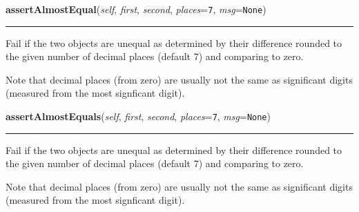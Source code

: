     \label{unittest:TestCase:failUnlessAlmostEqual}

    \vspace{0.5ex}

    \begin{boxedminipage}{\textwidth}

    \raggedright \textbf{assertAlmostEqual}(\textit{self}, \textit{first}, \textit{second}, \textit{places}=\texttt{7}, \textit{msg}=\texttt{None})

    \vspace{-1.5ex}

    \rule{\textwidth}{0.5\fboxrule}
    Fail if the two objects are unequal as determined by their difference 
    rounded to the given number of decimal places (default 7) and comparing
    to zero.

    Note that decimal places (from zero) are usually not the same as 
    significant digits (measured from the most signficant digit).

    \vspace{1ex}

    \end{boxedminipage}

    \label{unittest:TestCase:failUnlessAlmostEqual}

    \vspace{0.5ex}

    \begin{boxedminipage}{\textwidth}

    \raggedright \textbf{assertAlmostEquals}(\textit{self}, \textit{first}, \textit{second}, \textit{places}=\texttt{7}, \textit{msg}=\texttt{None})

    \vspace{-1.5ex}

    \rule{\textwidth}{0.5\fboxrule}
    Fail if the two objects are unequal as determined by their difference 
    rounded to the given number of decimal places (default 7) and comparing
    to zero.

    Note that decimal places (from zero) are usually not the same as 
    significant digits (measured from the most signficant digit).

    \vspace{1ex}

    \end{boxedminipage}

    \label{unittest:TestCase:failUnlessEqual}

